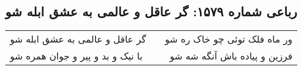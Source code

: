 \begin{center}
\section*{رباعی شماره ۱۵۷۹: گر عاقل و عالمی به عشق ابله شو}
\label{sec:1579}
\begin{longtable}{l p{0.5cm} r}
گر عاقل و عالمی به عشق ابله شو
&&
ور ماه فلک توئی چو خاک ره شو
\\
با نیک و بد و پیر و جوان همره شو
&&
فرزین و پیاده باش آنگه شه شو
\\
\end{longtable}
\end{center}
